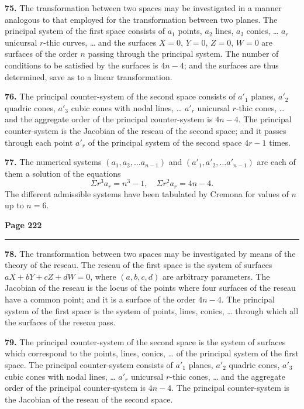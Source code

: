 \documentclass[12pt,a4paper]{article}
\theoremstyle{plain}
\theoremstyle{definition}
\theoremstyle{remark}
\begin{document}
\smallskip

\noindent\textbf{75.} The transformation between two spaces may be investigated in a manner analogous to that employed for the transformation between two planes. The principal system of the first space consists of $a_1$ points, $a_2$ lines, $a_3$ conics, \ldots{} $a_r$ unicursal $r$-thic curves, \ldots{} and the surfaces $X = 0$, $Y = 0$, $Z = 0$, $W = 0$ are surfaces of the order $n$ passing through the principal system. The number of conditions to be satisfied by the surfaces is $4n - 4$; and the surfaces are thus determined, save as to a linear transformation.

\textbf{76.} The principal counter-system of the second space consists of $a'_1$ planes, $a'_2$ quadric cones, $a'_3$ cubic cones with nodal lines, \ldots{} $a'_r$ unicursal $r$-thic cones, \ldots{} and the aggregate order of the principal counter-system is $4n - 4$. The principal counter-system is the Jacobian of the reseau of the second space; and it passes through each point $a'_r$ of the principal system of the second space $4r - 1$ times.

\textbf{77.} The numerical systems $(a_1, a_2, \ldots a_{n-1})$ and $(a'_1, a'_2, \ldots a'_{n-1})$ are each of them a solution of the equations
\[
\Sigma r^3 a_r = n^3 - 1, \quad \Sigma r^2 a_r = 4n - 4.
\]
The different admissible systems have been tabulated by Cremona for values of $n$ up to $n = 6$.

\newpage
\noindent\textbf{Page 222}\\
\noindent\rule{\textwidth}{0.4pt}

\smallskip

\noindent\textbf{78.} The transformation between two spaces may be investigated by means of the theory of the reseau. The reseau of the first space is the system of surfaces $aX + bY + cZ + dW = 0$, where $(a, b, c, d)$ are arbitrary parameters. The Jacobian of the reseau is the locus of the points where four surfaces of the reseau have a common point; and it is a surface of the order $4n - 4$. The principal system of the first space is the system of points, lines, conics, \ldots{} through which all the surfaces of the reseau pass.

\textbf{79.} The principal counter-system of the second space is the system of surfaces which correspond to the points, lines, conics, \ldots{} of the principal system of the first space. The principal counter-system consists of $a'_1$ planes, $a'_2$ quadric cones, $a'_3$ cubic cones with nodal lines, \ldots{} $a'_r$ unicursal $r$-thic cones, \ldots{} and the aggregate order of the principal counter-system is $4n - 4$. The principal counter-system is the Jacobian of the reseau of the second space.
\end{document}
